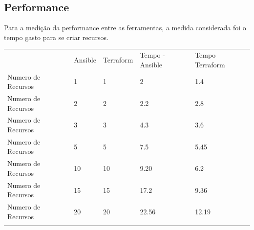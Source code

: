 \subsection{Performance}
Para a medição da performance entre as ferramentas, a medida considerada foi o tempo gasto para se criar recursos.

\begin{table}[ht]
\begin{tabular}{lllll}
                         & Ansible & Terraform & Tempo - Ansible & Tempo Terraform \\
Numero    de    Recursos & 1       & 1         & 2               & 1.4             \\
Numero    de    Recursos & 2       & 2         & 2.2             & 2.8             \\
Numero    de    Recursos & 3       & 3         & 4.3             & 3.6             \\
Numero    de    Recursos & 5       & 5         & 7.5             & 5.45            \\
Numero    de    Recursos & 10      & 10        & 9.20            & 6.2             \\
Numero    de    Recursos & 15      & 15        & 17.2            & 9.36            \\
Numero    de    Recursos & 20      & 20        & 22.56           & 12.19           \\
                         &         &           &                 &                
\end{tabular}
\end{table}


